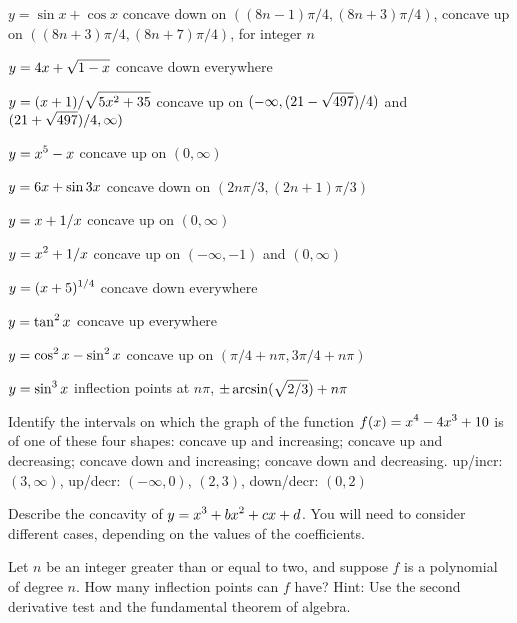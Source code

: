 \exercise $y=\sin x + \cos x$ 
\answer concave down on $((8n-1)\pi/4,(8n+3)\pi/4)$,
concave up on $((8n+3)\pi/4,(8n+7)\pi/4)$, for integer $n$
\endanswer
\endexercise

\exercise $\displaystyle y = 4x+\sqrt{1-x}$
\answer concave down everywhere
\endanswer
\endexercise

\exercise $\displaystyle y = (x+1)/\sqrt{5x^2 + 35}$
\answer concave up on $\displaystyle (-\infty,(21-\sqrt{497})/4)$ and 
$\displaystyle (21+\sqrt{497})/4,\infty)$
\endanswer
\endexercise

\exercise $\displaystyle y= x^5 - x$
\answer concave up on $(0,\infty)$
\endanswer
\endexercise

\exercise $\displaystyle y = 6x + \sin 3x$
\answer concave down on $(2n\pi/3,(2n+1)\pi/3)$
\endanswer
\endexercise

\exercise $\displaystyle y = x+ 1/x$
\answer concave up on $(0,\infty)$
\endanswer
\endexercise

\exercise $\displaystyle y = x^2+ 1/x$
\answer concave up on $(-\infty,-1)$ and $(0,\infty)$
\endanswer
\endexercise

\exercise $\displaystyle y = (x+5)^{1/4}$
\answer concave down everywhere
\endanswer
\endexercise

\exercise $\displaystyle y = \tan^2 x$
\answer concave up everywhere
\endanswer
\endexercise

\exercise $\displaystyle y =\cos^2 x - \sin^2 x$
\answer concave up on $(\pi/4+n\pi,3\pi/4+n\pi)$
\endanswer
\endexercise

\exercise $\displaystyle y = \sin^3 x$
\answer inflection points at $n\pi$, $\displaystyle \pm\arcsin(\sqrt{2/3})+n\pi$
\endanswer
\endexercise

\endtwocol

\msk \exercise Identify the intervals on which the graph of the function
$\displaystyle f(x) = x^4-4x^3 +10$ is of one of these four
shapes: concave up and increasing; concave up and decreasing; concave
down and increasing; concave down and decreasing.
\answer up/incr: $(3,\infty)$, up/decr: $(-\infty,0)$, $(2,3)$,
down/decr: $(0,2)$
\endanswer
\endexercise

\exercise Describe the concavity of $\displaystyle y =  x^3 + bx^2 + cx + d$.
You will need to consider different cases, depending on the values of
the coefficients.
\endexercise

\exercise Let $n$ be an integer greater than or equal to
two, and suppose $f$ is a polynomial of degree $n$. How many inflection points
can $f$ have?  Hint: Use the second derivative test and the
fundamental theorem of algebra.
\endexercise

